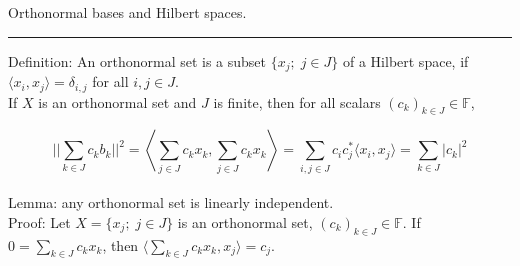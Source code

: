 \documentclass[12pt]{article}
\newcommand{\scalars}[0] { \mathbb{F}}
\begin{document}
\break

Orthonormal bases and Hilbert spaces.

\vspace{0.1in}

\hrule

\vspace{0.5in}

Definition: An orthonormal set is a subset $\{ x_j; \; j\in J\}$ of a Hilbert space, if $ \langle x_i, x_j \rangle = \delta_{i,j}$ for all $i,j \in J$.  \\

\noindent
If $X$ is an orthonormal set and $J$ is finite, then for all scalars $(c_k)_{k \in J} \in \scalars$,

$$
    || \sum_{k \in J} c_k b_k || ^2 = \left \langle \sum_{j \in J} c_k x_k, \sum_{j \in J} c_k x_k \right \rangle = \sum_{i,j \in J} c_i c_j^* \langle x_i, x_j \rangle = \sum_{k \in J} |c_k|^2
$$ \\

Lemma: any orthonormal set is linearly independent. \\

\noindent
Proof: Let $X = \{ x_j; \; j\in J\}$ is an orthonormal set, $(c_k)_{k \in J} \in \scalars$. If $0 = \sum_{k \in J} c_k x_k$, then $\langle \sum_{k \in J} c_k x_k, x_j \rangle = c_j$.
\end{document}
